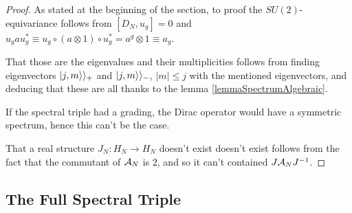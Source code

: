 \begin{proof}
As stated at the beginning of the section, to proof the $SU(2)$-equivariance follows from $[D_N, u_g] = 0$ and $u_g  a  u_g^* \equiv u_g \circ (a \otimes 1) \circ u_g^* = a^g \otimes 1 \equiv a_g$.

That those are the eigenvalues and their multiplicities follows from finding eigenvectors $|j, m \rangle\rangle_+$ and $|j, m\rangle\rangle_-$, $|m| \leq j$ with the mentioned eigenvectors, and deducing that these are all thanks to the lemma \ref{lemmaSpectrumAlgebraic}.

If the spectral triple had a grading, the Dirac operator would have a symmetric spectrum, hence this can't be the case.

That a real structure $J_N: H_N \to H_N$ doesn't exist doesn't exist follows from the fact that the commutant of $\mathcal A_N$ is $2$, and so it can't contained $J \mathcal A_N J^{-1}$.

\end{proof}


\subsection{The Full Spectral Triple}




    
    
